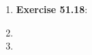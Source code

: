 \documentclass[12pt]{article}
\theoremstyle{plain}
\theoremstyle{definition}
\theoremstyle{remark}
\begin{document}
\begin{enumerate}
\item \textbf{Exercise 51.18}: 

\item 
\item 


\end{enumerate}





% 
\end{document}
